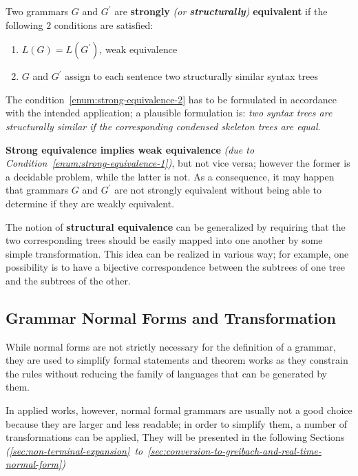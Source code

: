 \documentclass[english]{article}
\begin{document}
\begin{definition}
  \label{def:strong-equivalence}
  Two grammars \(G\) and \(G^\prime\) are \textbf{strongly} \textit{(or \textbf{structurally})} \textbf{equivalent} if the following \(2\) conditions are satisfied:

  \begin{enumerate}[label=\Alph*., ref=(\Alph*)]
    \item\label{enum:strong-equivalence-1} \(L(G) = L(G^\prime)\), weak equivalence
    \item\label{enum:strong-equivalence-2} \(G\) and \(G^\prime\) assign to each sentence two structurally similar syntax trees
  \end{enumerate}
\end{definition}

The condition~\ref{enum:strong-equivalence-2} has to be formulated in accordance with the intended application;
a plausible formulation is:
\textit{two syntax trees are structurally similar if the corresponding condensed skeleton trees are equal}.

\bigskip
\textbf{Strong equivalence implies weak equivalence} \textit{(due to Condition~\ref{enum:strong-equivalence-1})}, but not vice versa;
however the former is a decidable problem, while the latter is not.
As a consequence, it may happen that grammars \(G\) and \(G^\prime\) are not strongly equivalent without being able to determine if they are weakly equivalent.

\bigskip
The notion of \textbf{structural equivalence} can be generalized by requiring that the two corresponding trees should be easily mapped into one another by some simple transformation.
This idea can be realized in various way;
for example, one possibility is to have a bijective correspondence between the subtrees of one tree and the subtrees of the other.

\subsection{Grammar Normal Forms and Transformation}

While normal forms are not strictly necessary for the definition of a grammar, they are used to simplify formal statements and theorem works as they constrain the rules without reducing the family of languages that can be generated by them.

In applied works, however, normal formal grammars are usually not a good choice because they are larger and less readable;
in order to simplify them, a number of transformations can be applied,
They will be presented in the following Sections \textit{(\ref{sec:non-terminal-expansion}~to~\ref{sec:conversion-to-greibach-and-real-time-normal-form})}
\end{document}
